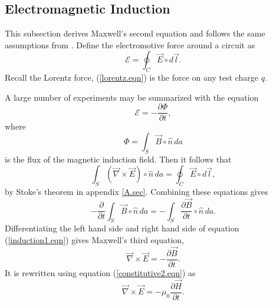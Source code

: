 \documentclass[12pt]{article}
\theoremstyle{definition}
\numberwithin{equation}{section}
\begin{document}
\subsection{Electromagnetic Induction}
This subsection derives Maxwell's second equation and follows the same assumptions from \cite{Reitz}. Define the electromotive force around a circuit as
$$\mathcal{E}=\oint_C\vec{E}\circ d\vec{l}.$$
Recall the Lorentz force, (\ref{lorentz.eqn}) is the force on any test charge $q$.

A large number of experiments may be summarized with the equation
$$\mathcal{E}=-\frac{\partial\Phi}{\partial t},$$
where $$\Phi=\int_S\vec{B}\circ\hat{n}\,da$$
is the flux of the magnetic induction field. Then it follows that
\begin{equation}
\int_S\left(\vec{\nabla}\times\vec{E}\right)\circ\hat{n}\, da=\oint_C\vec{E}\circ d\vec{l},\nonumber
\end{equation}
by Stoke's theorem in appendix \ref{A.sec}. Combining these equations gives
\begin{equation}
-\frac{\partial}{\partial t}\int_S\vec{B}\circ\hat{n}\,da=-\int_S\frac{\partial\vec{B}}{\partial t}\circ\hat{n}\,da.
\label{induction1.eqn}
\end{equation}
Differentiating the left hand side and right hand side of equation (\ref{induction1.eqn}) gives Maxwell's third equation,
$$\vec{\nabla}\times\vec{E}=-\frac{\partial\vec{B}}{\partial t}.$$ It is rewritten using equation (\ref{constitutive2.eqn}) as
\begin{equation}
\vec{\nabla}\times\vec{E}=-\mu_0\frac{\partial\vec{H}}{\partial t}.
\label{maxwell3.eqn}
\end{equation}
\end{document}
